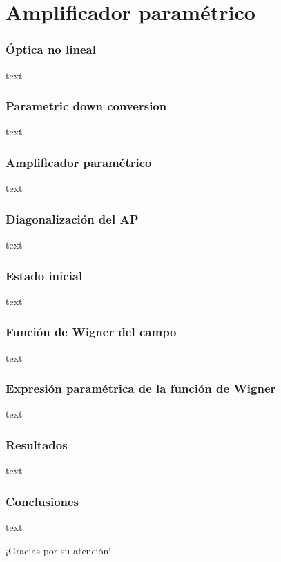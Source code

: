 \documentclass[xcolor=dvipsnames,slidestop,compress,mathserif, 11pt]{beamer}
\begin{document}
\section{Amplificador paramétrico}

\begin{frame}[c]
	\frametitle{Óptica no lineal}
	text
\end{frame}

\begin{frame}[c]
	\frametitle{Parametric down conversion}
	text
\end{frame}

\begin{frame}[c]
	\frametitle{Amplificador paramétrico}
	text
\end{frame}

\begin{frame}[c]
	\frametitle{Diagonalización del AP}
	text
\end{frame}

\begin{frame}[c]
	\frametitle{Estado inicial}
	text
\end{frame}

\begin{frame}[c]
	\frametitle{Función de Wigner del campo}
	text
\end{frame}

\begin{frame}[c]
	\frametitle{Expresión paramétrica de la función de Wigner}
	text
\end{frame}

\begin{frame}[c]
	\frametitle{Resultados}
	text
\end{frame}

\begin{frame}[c]
	\frametitle{Conclusiones}
	text
\end{frame}

\begin{frame}[c]
	\centering ¡Gracias por su atención!
\end{frame}
\end{document}
